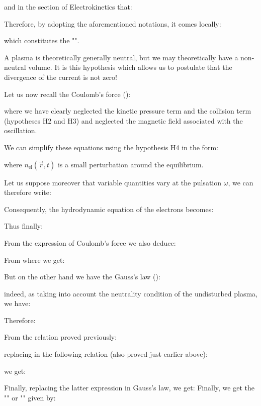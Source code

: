 	and in the section of Electrokinetics that:
	
	Therefore, by adopting the aforementioned notations, it comes locally:
	
	which constitutes the "".
	\begin{tcolorbox}[title=Remark,colframe=black,arc=10pt]
	A plasma is theoretically generally neutral, but we may theoretically have a non-neutral volume. It is this hypothesis which allows us to postulate that the divergence of the current is not zero!
	\end{tcolorbox}
	Let us now recall the Coulomb's force ():
	
	where we have clearly neglected the kinetic pressure term  and the collision term (hypotheses H2 and H3) and neglected the magnetic field associated with the oscillation.

	We can simplify these equations using the hypothesis H4 in the form:
	
	where $n_\text{el}(\vec{r},t)$ is a small perturbation around the equilibrium.
	
	Let us suppose moreover that variable quantities vary at the pulsation $\omega$, we can therefore write:
	
	Consequently, the hydrodynamic equation of the electrons becomes:
	
	Thus finally:
	
	From the expression of Coulomb's force we also deduce:
	
	From where we get:
	
	But on the other hand we have the Gauss's law ():
	
	indeed,  as taking into account the neutrality condition of the undisturbed plasma, we have:
	
	Therefore:
	
	From the relation proved previously:
	
	replacing in the following relation (also proved just earlier above):
	
	we get:
	
	Finally, replacing the latter expression in Gauss's law, we get:
	Finally, we get the "" or "" given by:
	
